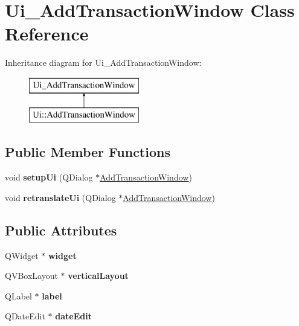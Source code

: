\hypertarget{class_ui___add_transaction_window}{}\section{Ui\+\_\+\+Add\+Transaction\+Window Class Reference}
\label{class_ui___add_transaction_window}
Inheritance diagram for Ui\+\_\+\+Add\+Transaction\+Window\+:\begin{figure}[H]
\begin{center}
\leavevmode
\includegraphics[height=2.000000cm]{class_ui___add_transaction_window}
\end{center}
\end{figure}
\subsection*{Public Member Functions}
\begin{DoxyCompactItemize}
\item 
\mbox{\label{class_ui___add_transaction_window_acc8c168b2fa7f518476b72fbf784b4f8}} 
void {\bfseries setup\+Ui} (Q\+Dialog $\ast$\mbox{\hyperlink{class_add_transaction_window}{Add\+Transaction\+Window}})
\item 
\mbox{\label{class_ui___add_transaction_window_aab5158e82c0b6a66de42d126d8d04c16}} 
void {\bfseries retranslate\+Ui} (Q\+Dialog $\ast$\mbox{\hyperlink{class_add_transaction_window}{Add\+Transaction\+Window}})
\end{DoxyCompactItemize}
\subsection*{Public Attributes}
\begin{DoxyCompactItemize}
\item 
\mbox{\label{class_ui___add_transaction_window_a97faeb58e81d6137b2773810365ae0ac}} 
Q\+Widget $\ast$ {\bfseries widget}
\item 
\mbox{\label{class_ui___add_transaction_window_a66f177d0d72536662c7867e9f40e0574}} 
Q\+V\+Box\+Layout $\ast$ {\bfseries vertical\+Layout}
\item 
\mbox{\label{class_ui___add_transaction_window_a0fc530310ecead05f86bc336ca84ee66}} 
Q\+Label $\ast$ {\bfseries label}
\item 
\mbox{\label{class_ui___add_transaction_window_a413323174a4fabac612e37fb2140303f}} 
Q\+Date\+Edit $\ast$ {\bfseries date\+Edit}
\end{DoxyCompactItemize}


